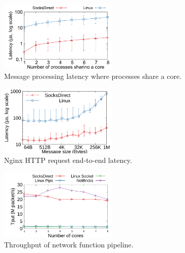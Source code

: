 \begin{figure}[t!]
		
		\centering \includegraphics[width=0.5\textwidth]{eval/microbenchmark/sharecore-lat.pdf}
		
		\caption{Message processing latency where processes share a core.}
		\label{socksdirect:fig:eval-context-switch}
\end{figure}
\begin{figure}[t!]
				\centering \includegraphics[width=0.5\textwidth]{eval/web/msgsize-clocal-lat.pdf}
		
		\caption{Nginx HTTP request end-to-end latency.}
		\label{socksdirect:fig:eval-nginx}
\end{figure}
\begin{figure}[t!]
		\centering
		\includegraphics[width=0.5\textwidth]{eval/microbenchmark/nfv-tun-tput.pdf}
		
		\caption{Throughput of network function pipeline.}
		\label{socksdirect:fig:eval-tun-tput}
		
		
\end{figure}


